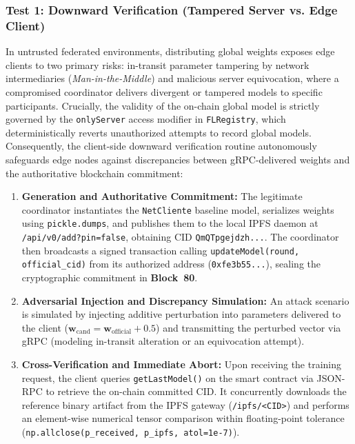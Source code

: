 \subsubsection{Test 1: Downward Verification (Tampered Server vs. Edge Client)}
\label{subsubsec:ataque_descendente}
In untrusted federated environments, distributing global weights exposes edge clients to two primary risks: in-transit parameter tampering by network intermediaries (\textit{Man-in-the-Middle}) and malicious server equivocation, where a compromised coordinator delivers divergent or tampered models to specific participants. Crucially, the validity of the on-chain global model is strictly governed by the \texttt{onlyServer} access modifier in \texttt{FLRegistry}, which deterministically reverts unauthorized attempts to record global models. Consequently, the client-side downward verification routine autonomously safeguards edge nodes against discrepancies between gRPC-delivered weights and the authoritative blockchain commitment:
\begin{enumerate}
    \item \textbf{Generation and Authoritative Commitment:} The legitimate coordinator instantiates the \texttt{NetCliente} baseline model, serializes weights using \texttt{pickle.dumps}, and publishes them to the local IPFS daemon at \texttt{/api/v0/add?pin=false}, obtaining CID \texttt{QmQTpgejdzh...}. The coordinator then broadcasts a signed transaction calling \texttt{updateModel(round, official\_cid)} from its authorized address (\texttt{0xfe3b55...}), sealing the cryptographic commitment in \textbf{Block~80}.
    \item \textbf{Adversarial Injection and Discrepancy Simulation:} An attack scenario is simulated by injecting additive perturbation into parameters delivered to the client ($\mathbf{w}_{\text{cand}} = \mathbf{w}_{\text{official}} + 0.5$) and transmitting the perturbed vector via gRPC (modeling in-transit alteration or an equivocation attempt).
    \item \textbf{Cross-Verification and Immediate Abort:} Upon receiving the training request, the client queries \texttt{getLastModel()} on the smart contract via JSON-RPC to retrieve the on-chain committed CID. It concurrently downloads the reference binary artifact from the IPFS gateway (\texttt{/ipfs/<CID>}) and performs an element-wise numerical tensor comparison within floating-point tolerance (\texttt{np.allclose(p\_received, p\_ipfs, atol=1e-7)}).
\end{enumerate}

